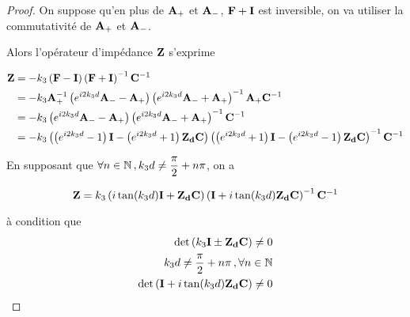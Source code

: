 \begin{proof}
            On suppose qu'en plus de $\mathbf{A}_+$ et $\mathbf{A}_-$, $\mathbf{F} + \mathbf{I}$ est inversible, on va utiliser la commutativité de $\mathbf{A}_+$ et $\mathbf{A}_-$.

            Alors l'opérateur d'impédance $\mathbf{Z}$ s'exprime

            \begin{align}
                \mathbf{Z}
                &=-k_3\left(\mathbf{F} - \mathbf{I} \right)\left(\mathbf{F}+ \mathbf{I} \right)^{-1}\mathbf{C}^{-1}
                \\
                &=-k_3\mathbf{A}_+^{-1}\left(e^{i2 k_3 d}\mathbf{A}_- - \mathbf{A}_+ \right)\left(e^{i2 k_3 d}\mathbf{A}_- + \mathbf{A}_+ \right)^{-1}\mathbf{A}_+\mathbf{C}^{-1}
                \\
                &= -k_3\left( e^{i2 k_3 d} \mathbf{A}_- -  \mathbf{A}_+\right)
                \left( e^{i2 k_3 d} \mathbf{A}_- + \mathbf{A}_+ \right)^{-1}\mathbf{C}^{-1}
                \\
                &= -k_3\left(\left( e^{i2 k_3 d} - 1 \right)\mathbf{I} - \left( e^{i2 k_3 d} + 1 \right) \mathbf{Z_d}\mathbf{C} \right)
                \left( \left( e^{i2 k_3 d} + 1 \right)\mathbf{I} - \left( e^{i2 k_3 d} - 1 \right)\mathbf{Z_d}\mathbf{C} \right)^{-1}\mathbf{C}^{-1}   
            \end{align}

            En supposant que $\forall n \in \mathbb N \,, k_3d\not = \dfrac{\pi}{2}+n\pi$, on a

            \begin{equation}
            \mathbf{Z} = k_3\left(i\tan(k_3 d)\mathbf{I} + \mathbf{Z_d}\mathbf{C} \right)
                \left( \mathbf{I} + i\tan(k_3 d)\mathbf{Z_d}\mathbf{C} \right)^{-1}\mathbf{C}^{-1} 
            \end{equation}

            à condition que 
            \begin{align}
                \det\left(k_3\mathbf{I} \pm \mathbf{Z_d}\mathbf{C} \right) \not = 0 \\
                k_3d\not = \dfrac{\pi}{2}+n\pi\,, \forall n \in \mathbb N \\
                \det\left(\mathbf{I} + i\tan(k_3d)\mathbf{Z_d}\mathbf{C}\right) \not = 0
            \end{align}

        \end{proof}



